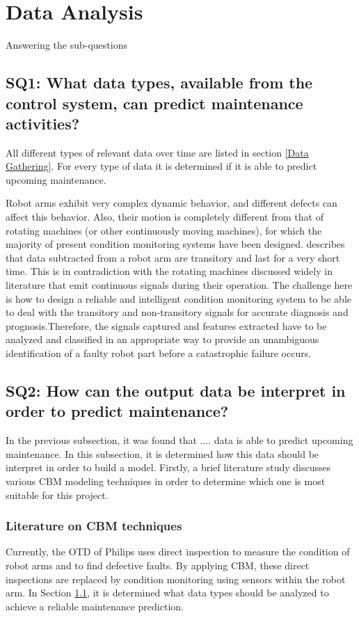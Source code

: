 \chapter{Data Analysis} \label{Chapter5}
Answering the sub-questions

\section{SQ1: What data types, available from the control system, can predict maintenance activities?} \label{SQ1}
All different types of relevant data over time are listed in section \ref{Data Gathering}. For every type of data it is determined if it is able to predict upcoming maintenance. 

Robot arms exhibit very complex dynamic behavior, and different defects can affect this behavior. Also, their motion is completely different from that of rotating machines (or other continuously moving machines), for which the majority of present condition monitoring systems have been designed. \citet{Jaber2017} describes that data subtracted from a robot arm are transitory and last for a very short time. This is in contradiction with the rotating machines discussed widely in literature that emit continuous signals during their operation. The challenge here is how to design a reliable and intelligent condition monitoring system to be able to deal with the transitory and non-transitory signals for accurate diagnosis and prognosis.Therefore, the signals captured and features extracted have to be analyzed and classified in an appropriate way to provide an unambiguous identification of a faulty robot part before a catastrophic failure occurs.

\section{SQ2: How can the output data be interpret in order to predict maintenance?} \label{SQ2}
In the previous subsection, it was found that .... data is able to predict upcoming maintenance. In this subsection, it is determined how this data should be interpret in order to build a model. Firstly, a brief literature study discusses various CBM modeling techniques in order to determine which one is most suitable for this project.

\subsection{Literature on CBM techniques} \label{CBM techniques}
Currently, the OTD of Philips uses direct inspection to measure the condition of robot arms and to find defective faults. By applying CBM, these direct inspections are replaced by condition monitoring using sensors within the robot arm. In Section \ref{SQ1}, it is determined what data types should be analyzed to achieve a reliable maintenance prediction. 

